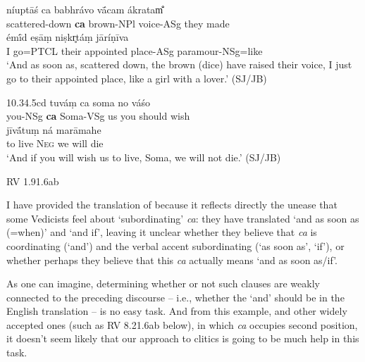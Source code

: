 \documentclass[output=paper,
modfonts
]{LSP/langsci}
\begin{document}
\begin{exe}
\ex\label{2Psubca}
	\begin{xlist}
	\ex\gll níuptāś ca babhrávo vā́cam ákratam̐ \\
			scattered-down \textbf{ca} brown-NPl voice-ASg {they made}\\
			
		\gll émī́d eṣāṃ niṣkr̥táṃ jāríṇīva \\
			 {I go=PTCL} their {appointed place-ASg} {paramour-NSg}=like \\
		\glt `And as soon as, scattered down, the brown (dice) have raised their voice, I just go to their appointed place, like a girl with a lover.' (SJ/JB)
		
		\hfill {10.34.5cd}
	\ex\gll tuváṃ ca soma no váśo\\
			you-NSg \textbf{ca} Soma-VSg us {you should wish}\\

		\gll jīvā́tuṃ ná marāmahe \\
			 {to live} \textsc{Neg} {we will die} \\
		\glt `And if you will wish us to live, Soma, we will not die.' (SJ/JB)
		
		\hfill {RV 1.91.6ab}
	\end{xlist}
\end{exe}

\noindent I have provided the translation of \citet{jamison2014} because it reflects directly the unease
that some Vedicists feel about `subordinating' \textit{ca}: they have translated `and as soon as (=when)' and
`and if', leaving
it unclear whether they believe that \textit{ca} is coordinating (`and') and the verbal accent
subordinating (`as soon as', `if'), or whether perhaps they believe that this \textit{ca} actually means `and as soon as/if'.

As one can imagine, determining whether or not such clauses are weakly connected to the preceding
discourse -- i.e., whether the `and' should be in the English translation -- is no easy task. And from
this example, and other widely accepted ones (such as RV 8.21.6ab below), in which \textit{ca} occupies
second position, it doesn't seem likely that our approach to clitics is going to be much help
in this task.

\end{document}
